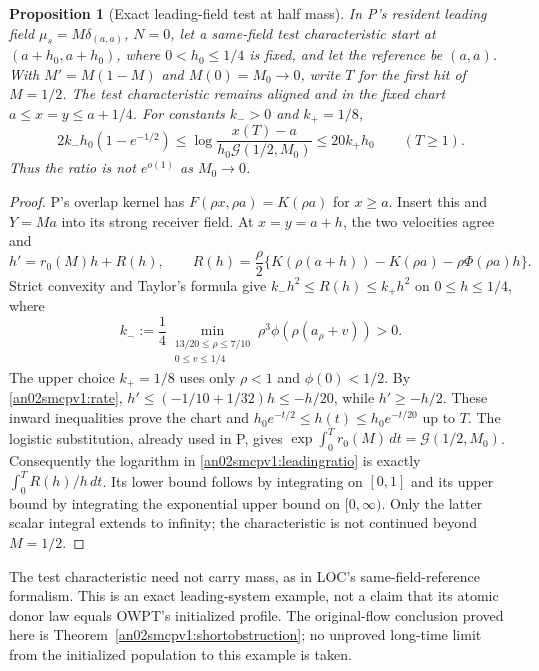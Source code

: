 \documentclass[11pt]{article}
\newtheorem{proposition}[theorem]{Proposition}
\theoremstyle{remark}\newtheorem{remark}[theorem]{Remark}
\newcommand{\dd}{\,d}
\begin{document}
\begin{proposition}[Exact leading-field test at half mass]
\label{an02smcpv1:leadingtest}
In P's resident leading field $\mu_s=M\delta_{(a,a)}$, $N=0$,
let a same-field test characteristic start at
$(a+h_0,a+h_0)$, where $0<h_0\le1/4$ is fixed, and let the
reference be $(a,a)$. With $M'=M(1-M)$ and $M(0)=M_0\to0$,
write $T$ for the first hit of $M=1/2$.
The test characteristic remains aligned and in the fixed chart
$a\le x=y\le a+1/4$. For constants $k_->0$ and $k_+=1/8$,
\begin{equation}\label{an02smcpv1:leadingratio}
 2k_-h_0(1-e^{-1/2})
 \le\log\frac{x(T)-a}{h_0\mathcal G(1/2,M_0)}
 \le20k_+h_0
 \qquad(T\ge1).
\end{equation}
Thus the ratio is not $e^{o(1)}$ as $M_0\to0$.
\end{proposition}
\begin{proof}
P's overlap kernel has
$F(\rho x,\rho a)=K(\rho a)$ for $x\ge a$.
Insert this and $Y=Ma$ into its strong receiver field. At
$x=y=a+h$, the two velocities agree and
\begin{equation}\label{an02smcpv1:nonlinearleading}
 h'=r_0(M)h+R(h),\qquad
 R(h)=\frac\rho2\{K(\rho(a+h))-K(\rho a)
                         -\rho\Phi(\rho a)h\}.
\end{equation}
Strict convexity and Taylor's formula give
$k_-h^2\le R(h)\le k_+h^2$ on $0\le h\le1/4$, where
\[
 k_-:=\frac14\min_{\substack{13/20\le\rho\le7/10\\0\le v\le1/4}}
              \rho^3\phi(\rho(a_\rho+v))>0.
\]
The upper choice $k_+=1/8$ uses only $\rho<1$ and
$\phi(0)<1/2$. By \eqref{an02smcpv1:rate},
$h'\le(-1/10+1/32)h\le-h/20$, while $h'\ge-h/2$.
These inward inequalities prove the chart and
$h_0e^{-t/2}\le h(t)\le h_0e^{-t/20}$ up to $T$.
The logistic substitution, already used in P, gives
$\exp\int_0^T r_0(M)\dd t=\mathcal G(1/2,M_0)$.
Consequently the logarithm in \eqref{an02smcpv1:leadingratio}
is exactly $\int_0^T R(h)/h\dd t$.
Its lower bound follows by integrating on $[0,1]$ and its upper
bound by integrating the exponential upper bound on $[0,\infty)$.
Only the latter scalar integral extends to infinity; the
characteristic is not continued beyond $M=1/2$.
\end{proof}

The test characteristic need not carry mass, as in LOC's
same-field-reference formalism. This is an exact leading-system
example, not a claim that its atomic donor law equals OWPT's
initialized profile. The original-flow conclusion proved here is
Theorem~\ref{an02smcpv1:shortobstruction}; no unproved long-time
limit from the initialized population to this example is taken.
\end{document}
